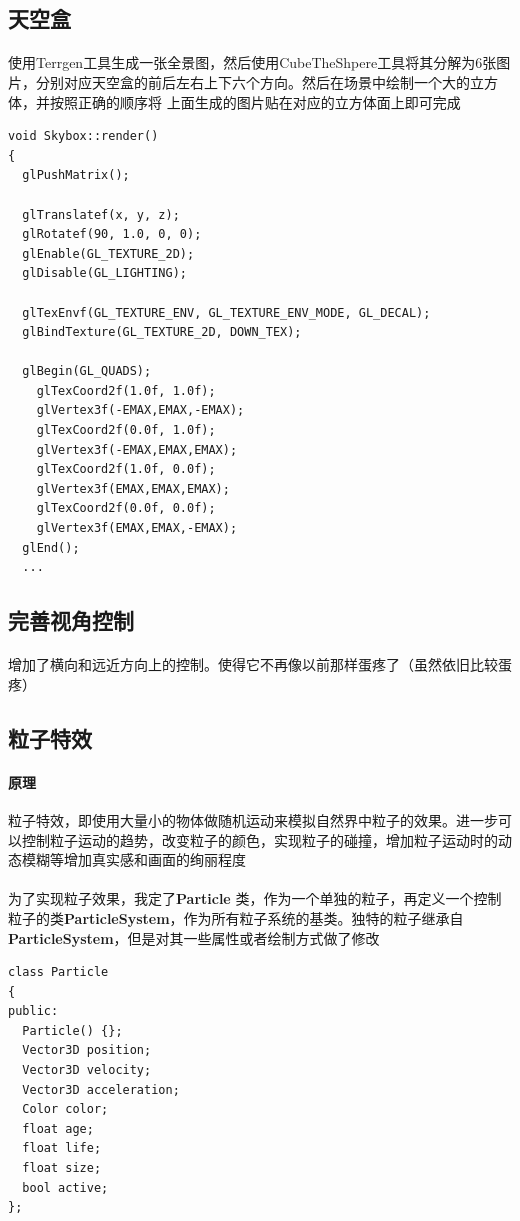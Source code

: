\documentclass{article}
\begin{document}
        \subsection{天空盒}
            \paragraph{}使用Terrgen工具生成一张全景图，然后使用CubeTheShpere工具将其分解为6张图片，分别对应天空盒的前后左右上下六个方向。然后在场景中绘制一个大的立方体，并按照正确的顺序将
            上面生成的图片贴在对应的立方体面上即可完成
                        \begin{lstlisting}[language={[ANSI]C}]
void Skybox::render()
{
  glPushMatrix();

  glTranslatef(x, y, z);
  glRotatef(90, 1.0, 0, 0);
  glEnable(GL_TEXTURE_2D);
  glDisable(GL_LIGHTING);

  glTexEnvf(GL_TEXTURE_ENV, GL_TEXTURE_ENV_MODE, GL_DECAL);
  glBindTexture(GL_TEXTURE_2D, DOWN_TEX);

  glBegin(GL_QUADS);
	glTexCoord2f(1.0f, 1.0f); 
    glVertex3f(-EMAX,EMAX,-EMAX);	
	glTexCoord2f(0.0f, 1.0f); 
    glVertex3f(-EMAX,EMAX,EMAX);	
	glTexCoord2f(1.0f, 0.0f); 
    glVertex3f(EMAX,EMAX,EMAX);  	
	glTexCoord2f(0.0f, 0.0f); 
    glVertex3f(EMAX,EMAX,-EMAX);	
  glEnd();
  ...
            \end{lstlisting}
        \subsection{完善视角控制}
            \paragraph{}
            增加了横向和远近方向上的控制。使得它不再像以前那样蛋疼了（虽然依旧比较蛋疼）
        \subsection{粒子特效}
            \paragraph{原理}
            粒子特效，即使用大量小的物体做随机运动来模拟自然界中粒子的效果。进一步可以控制粒子运动的趋势，改变粒子的颜色，实现粒子的碰撞，增加粒子运动时的动态模糊等增加真实感和画面的绚丽程度
            \paragraph{}
            为了实现粒子效果，我定了\textbf{Particle} 类，作为一个单独的粒子，再定义一个控制粒子的类\textbf{ParticleSystem}，作为所有粒子系统的基类。独特的粒子继承自\textbf{ParticleSystem}，但是对其一些属性或者绘制方式做了修改
            \begin{lstlisting}[language={[ANSI]C}]
class Particle
{
public:
  Particle() {};
  Vector3D position;
  Vector3D velocity;
  Vector3D acceleration;
  Color color;
  float age;
  float life;
  float size;
  bool active;
};
            \end{lstlisting}
\end{document}
